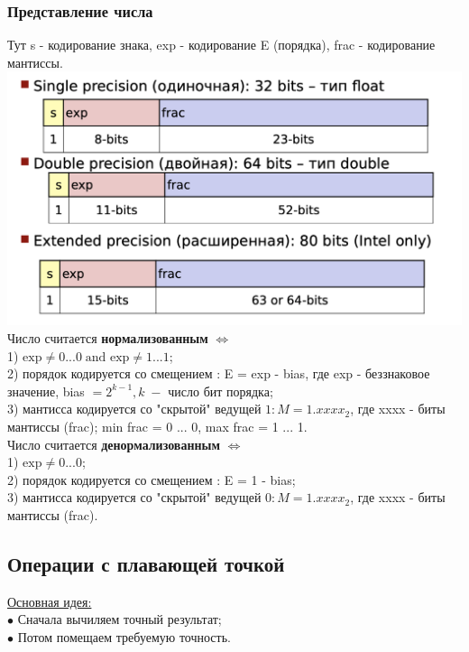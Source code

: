 \documentclass[12pt]{article}
\begin{document}
\subsubsection*{Представление числа}
Тут s - кодирование знака, exp - кодирование E (порядка), frac - кодирование мантиссы. \\
\includegraphics[scale=0.4]{./encoding.png} \\

Число считается \textbf{нормализованным} $\Leftrightarrow$ \\
1) $\text{exp} \neq 0 ... 0 \; \text{and exp} \neq 1 ... 1$; \\
2) порядок кодируется со смещением : E = exp - bias, где exp - беззнаковое значение, bias $= 2^{k - 1}, k \; - $ число бит порядка; \\
3) мантисса кодируется со "скрытой" ведущей $1:M = 1.xxxx_{2}$, где xxxx - биты мантиссы (frac); min frac = 0 ... 0, max frac = 1 ... 1.  \\

Число считается \textbf{денормализованным} $\Leftrightarrow$ \\
1) $\text{exp} \neq 0 ... 0$; \\
2) порядок кодируется со смещением : E = 1 - bias; \\
3) мантисса кодируется со "скрытой" ведущей $0:M = 1.xxxx_{2}$, где xxxx - биты мантиссы (frac). 

\subsection{Операции с плавающей точкой}
\underline{Основная идея:} \\
$\bullet$ Сначала вычиляем точный результат; \\
$\bullet$ Потом помещаем требуемую точность. 
\end{document}
